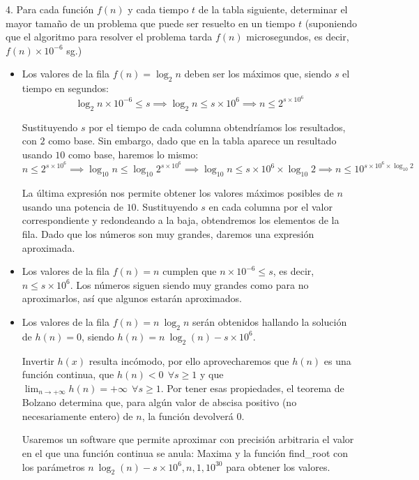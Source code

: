 \begin{ejercicio}
{4. Para cada función $f(n)$ y cada tiempo $t$ de la tabla siguiente, determinar el mayor tamaño de un problema que puede ser resuelto en un tiempo $t$ (suponiendo que el algoritmo para resolver el problema tarda $f(n)$ microsegundos, es decir, $f(n) \times 10^{-6}$ sg.)}

\begin{itemize}
\item Los valores de la fila $f(n) = \log_2 n$ deben ser los máximos que, siendo $s$ el tiempo en segundos: 
$$
\log_2 n \times 10^{-6} \le s \implies \log_2 n \le s \times 10^6 \implies n \le 2^{s \times 10^6}
$$

Sustituyendo $s$ por el tiempo de cada columna obtendríamos los resultados, con $2$ como base. Sin embargo, dado que en la tabla aparece un resultado usando $10$ como base, haremos lo mismo:
$$
n \le 2^{s \times 10^6} \implies \log_{10} n \le \log_{10} 2^{s \times 10^6} \implies \log_{10} n \le {s \times 10^6} \times \log_{10} 2 \implies n \le 10^{{s \times 10^6} \times \log_{10} 2}
$$

La última expresión nos permite obtener los valores máximos posibles de $n$ usando una potencia de $10$. Sustituyendo $s$ en cada columna por el valor correspondiente y redondeando a la baja, obtendremos los elementos de la fila. Dado que los números son muy grandes, daremos una expresión aproximada.

\item Los valores de la fila $f(n) = n$ cumplen que $
n \times 10^{-6} \le s$, es decir, $n \le s \times 10^6$. Los números siguen siendo muy grandes como para no aproximarlos, así que algunos estarán aproximados.

\item Los valores de la fila $f(n) = n\ \log_2 n$ serán obtenidos hallando la solución de $h(n) = 0$, siendo $h(n) = n\ \log_2(n) - s \times 10^6$.

Invertir $h(x)$ resulta incómodo, por ello aprovecharemos que $h(n)$ es una función continua, que $h(n) < 0 \ \ \forall s \ge 1$ y que $\displaystyle \lim_{n \to +\infty} h(n) = +\infty \ \ \forall s \ge 1$. Por tener esas propiedades, el teorema de Bolzano determina que, para algún valor de abscisa positivo (no necesariamente entero) de $n$, la función devolverá $0$.

Usaremos un software que permite aproximar con precisión arbitraria el valor en el que una función continua se anula: Maxima y la función find\_root con los parámetros $n\ \log_2(n) - s \times 10^6, n, 1, 10^{30}$ para obtener los valores.


\end{itemize}
\end{ejercicio}
